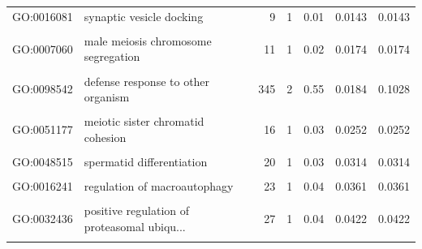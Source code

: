 \documentclass[
  11pt,
]{article}
\begin{document}
\begin{longtable}[t]{l>{\raggedright\arraybackslash}p{7cm}rrrll}
GO:0016081 & synaptic vesicle docking & 9 & 1 & 0.01 & 0.0143 & 0.0143\\
\cellcolor{gray!10}{GO:1903076} & \cellcolor{gray!10}{regulation of protein localization to pl...} & \cellcolor{gray!10}{9} & \cellcolor{gray!10}{1} & \cellcolor{gray!10}{0.01} & \cellcolor{gray!10}{0.0143} & \cellcolor{gray!10}{0.0143}\\
GO:0007060 & male meiosis chromosome segregation & 11 & 1 & 0.02 & 0.0174 & 0.0174\\
\cellcolor{gray!10}{GO:0006893} & \cellcolor{gray!10}{Golgi to plasma membrane transport} & \cellcolor{gray!10}{19} & \cellcolor{gray!10}{2} & \cellcolor{gray!10}{0.03} & \cellcolor{gray!10}{0.0177} & \cellcolor{gray!10}{0.0004}\\
\addlinespace
GO:0098542 & defense response to other organism & 345 & 2 & 0.55 & 0.0184 & 0.1028\\
\cellcolor{gray!10}{GO:0090090} & \cellcolor{gray!10}{negative regulation of canonical Wnt sig...} & \cellcolor{gray!10}{14} & \cellcolor{gray!10}{1} & \cellcolor{gray!10}{0.02} & \cellcolor{gray!10}{0.0221} & \cellcolor{gray!10}{0.0221}\\
GO:0051177 & meiotic sister chromatid cohesion & 16 & 1 & 0.03 & 0.0252 & 0.0252\\
\cellcolor{gray!10}{GO:0007189} & \cellcolor{gray!10}{adenylate cyclase-activating G protein-c...} & \cellcolor{gray!10}{18} & \cellcolor{gray!10}{1} & \cellcolor{gray!10}{0.03} & \cellcolor{gray!10}{0.0283} & \cellcolor{gray!10}{0.0283}\\
GO:0048515 & spermatid differentiation & 20 & 1 & 0.03 & 0.0314 & 0.0314\\
\addlinespace
\cellcolor{gray!10}{GO:0009308} & \cellcolor{gray!10}{amine metabolic process} & \cellcolor{gray!10}{22} & \cellcolor{gray!10}{1} & \cellcolor{gray!10}{0.04} & \cellcolor{gray!10}{0.0345} & \cellcolor{gray!10}{0.0345}\\
GO:0016241 & regulation of macroautophagy & 23 & 1 & 0.04 & 0.0361 & 0.0361\\
\cellcolor{gray!10}{GO:0051307} & \cellcolor{gray!10}{meiotic chromosome separation} & \cellcolor{gray!10}{23} & \cellcolor{gray!10}{1} & \cellcolor{gray!10}{0.04} & \cellcolor{gray!10}{0.0361} & \cellcolor{gray!10}{0.0361}\\
GO:0032436 & positive regulation of proteasomal ubiqu... & 27 & 1 & 0.04 & 0.0422 & 0.0422\\
\cellcolor{gray!10}{GO:0090597} & \cellcolor{gray!10}{nematode male tail mating organ morphoge...} & \cellcolor{gray!10}{27} & \cellcolor{gray!10}{1} & \cellcolor{gray!10}{0.04} & \cellcolor{gray!10}{0.0422} & \cellcolor{gray!10}{0.0422}\\

\end{longtable}
\end{document}
